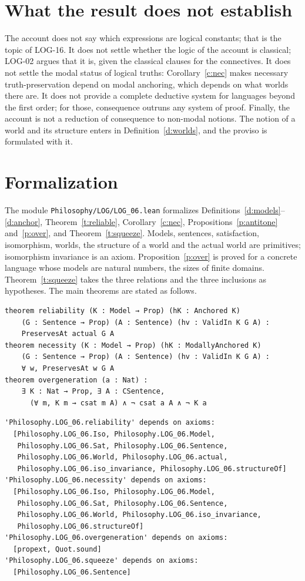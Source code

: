 \documentclass{situationist-preprint}
\begin{document}
\section{What the result does not establish}

The account does not say which expressions are logical constants; that is the topic of LOG-16. It does not settle whether the logic of the account is classical; LOG-02 argues that it is, given the classical clauses for the connectives. It does not settle the modal status of logical truths: Corollary~\ref{c:nec} makes necessary truth-preservation depend on modal anchoring, which depends on what worlds there are. It does not provide a complete deductive system for languages beyond the first order; for those, consequence outruns any system of proof. Finally, the account is not a reduction of consequence to non-modal notions. The notion of a world and its structure enters in Definition~\ref{d:worlds}, and the proviso is formulated with it.

\section{Formalization}

The module \nolinkurl{Philosophy/LOG/LOG_06.lean} formalizes Definitions~\ref{d:models}--\ref{d:anchor}, Theorem~\ref{t:reliable}, Corollary~\ref{c:nec}, Propositions~\ref{p:antitone} and~\ref{p:over}, and Theorem~\ref{t:squeeze}. Models, sentences, satisfaction, isomorphism, worlds, the structure of a world and the actual world are primitives; isomorphism invariance is an axiom. Proposition~\ref{p:over} is proved for a concrete language whose models are natural numbers, the sizes of finite domains. Theorem~\ref{t:squeeze} takes the three relations and the three inclusions as hypotheses. The main theorems are stated as follows.

\begin{lstlisting}
theorem reliability (K : Model → Prop) (hK : Anchored K)
    (G : Sentence → Prop) (A : Sentence) (hv : ValidIn K G A) :
    PreservesAt actual G A
theorem necessity (K : Model → Prop) (hK : ModallyAnchored K)
    (G : Sentence → Prop) (A : Sentence) (hv : ValidIn K G A) :
    ∀ w, PreservesAt w G A
theorem overgeneration (a : Nat) :
    ∃ K : Nat → Prop, ∃ A : CSentence,
      (∀ m, K m → csat m A) ∧ ¬ csat a A ∧ ¬ K a
\end{lstlisting}

\begin{lstlisting}
'Philosophy.LOG_06.reliability' depends on axioms:
  [Philosophy.LOG_06.Iso, Philosophy.LOG_06.Model,
   Philosophy.LOG_06.Sat, Philosophy.LOG_06.Sentence,
   Philosophy.LOG_06.World, Philosophy.LOG_06.actual,
   Philosophy.LOG_06.iso_invariance, Philosophy.LOG_06.structureOf]
'Philosophy.LOG_06.necessity' depends on axioms:
  [Philosophy.LOG_06.Iso, Philosophy.LOG_06.Model,
   Philosophy.LOG_06.Sat, Philosophy.LOG_06.Sentence,
   Philosophy.LOG_06.World, Philosophy.LOG_06.iso_invariance,
   Philosophy.LOG_06.structureOf]
'Philosophy.LOG_06.overgeneration' depends on axioms:
  [propext, Quot.sound]
'Philosophy.LOG_06.squeeze' depends on axioms:
  [Philosophy.LOG_06.Sentence]
\end{lstlisting}
\end{document}

